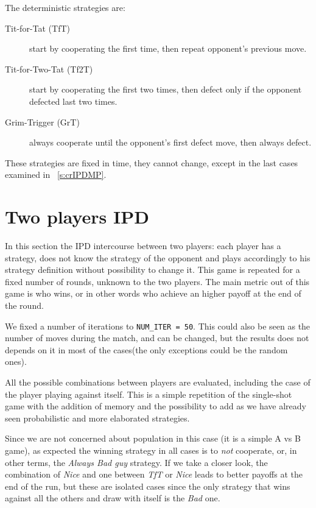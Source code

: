 \documentclass[journal,a4paper,10pt,twoside,draft=false]{IEEEtran}
\begin{document}
The deterministic strategies are:
\begin{description}
    \item[Tit-for-Tat (TfT)] start by cooperating the first time, then repeat opponent's previous move.
    \item[Tit-for-Two-Tat (Tf2T)] start by cooperating the first two times, then defect only if the opponent defected last two times.
    \item[Grim-Trigger (GrT)] always cooperate until the opponent's first defect move, then always defect. 
\end{description}

These strategies are fixed in time, they cannot change, except in the last cases examined in ~\ref{s:crIPDMP}.

\section{Two players IPD} \label{s:IPD2P}
In this section the IPD intercourse between two players: each player has a strategy, does not know the strategy of the opponent and plays accordingly to his strategy definition without possibility to change it. This game is repeated for a fixed number of rounds, unknown to the two players. The main metric out of this game is who wins, or in other words who achieve an higher payoff at the end of the round.

We fixed a number of iterations to \texttt{NUM\_ITER = 50}. This could also be seen as the number of moves during the match, and can be changed, but the results does not depends on it in most of the cases(the only exceptions could be the random ones).

All the possible combinations between players are evaluated, including the case of the player playing against itself.
This is a simple repetition of the single-shot game with the addition of memory and the possibility to add as we have already seen probabilistic and more elaborated strategies.

Since we are not concerned about population in this case (it is a simple A vs B game), as expected the winning strategy in all cases is to \textit{not} cooperate, or, in other terms, the \textit{Always Bad guy} strategy.
If we take a closer look, the combination of \textit{Nice} and one between \textit{TfT} or \textit{Nice} leads to better payoffs at the end of the run, but these are isolated cases since the only strategy that wins against all the others and draw with itself is the \textit{Bad} one.
\end{document}
